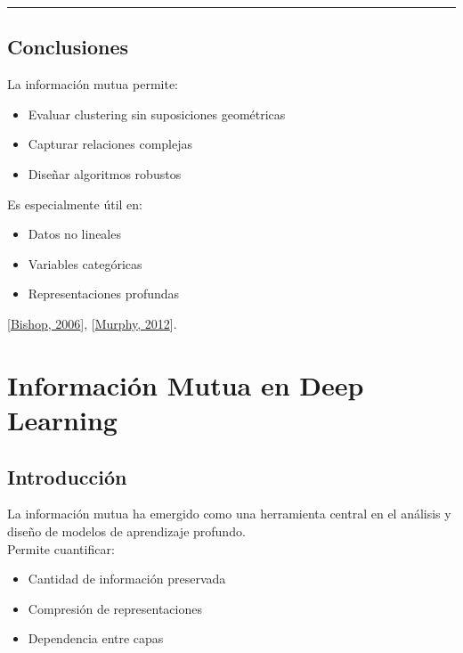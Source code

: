 \documentclass[letterpaper,10pt,english]{jupyterBook}
\begin{document}
\bigskip\hrule\bigskip



\section{Conclusiones}
\label{\detokenize{04_data_science_applications/clustering_mi:conclusiones}}
\sphinxAtStartPar
La información mutua permite:
\begin{itemize}
\item {} 
\sphinxAtStartPar
Evaluar clustering sin suposiciones geométricas

\item {} 
\sphinxAtStartPar
Capturar relaciones complejas

\item {} 
\sphinxAtStartPar
Diseñar algoritmos robustos

\end{itemize}

\sphinxAtStartPar
Es especialmente útil en:
\begin{itemize}
\item {} 
\sphinxAtStartPar
Datos no lineales

\item {} 
\sphinxAtStartPar
Variables categóricas

\item {} 
\sphinxAtStartPar
Representaciones profundas

\end{itemize}

\sphinxAtStartPar
{[}\hyperlink{cite.05_appendices/references:id4}{Bishop, 2006}{]}, {[}\hyperlink{cite.05_appendices/references:id5}{Murphy, 2012}{]}.

\sphinxstepscope


\chapter{Información Mutua en Deep Learning}
\label{\detokenize{04_data_science_applications/deep_learning_mi:informacion-mutua-en-deep-learning}}\label{\detokenize{04_data_science_applications/deep_learning_mi::doc}}

\section{Introducción}
\label{\detokenize{04_data_science_applications/deep_learning_mi:introduccion}}
\sphinxAtStartPar
La información mutua ha emergido como una herramienta central en el análisis y diseño de modelos de aprendizaje profundo.\\
Permite cuantificar:
\begin{itemize}
\item {} 
\sphinxAtStartPar
Cantidad de información preservada

\item {} 
\sphinxAtStartPar
Compresión de representaciones

\item {} 
\sphinxAtStartPar
Dependencia entre capas

\end{itemize}
\end{document}
